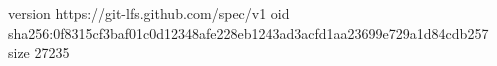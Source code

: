 version https://git-lfs.github.com/spec/v1
oid sha256:0f8315cf3baf01c0d12348afe228eb1243ad3acfd1aa23699e729a1d84cdb257
size 27235
